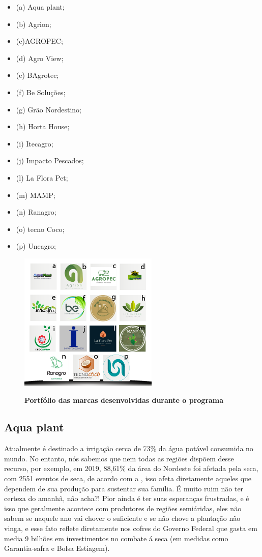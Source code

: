 \begin{multicols}{3}
\centering
    \begin{itemize}
\item {(a) Aqua plant;}
\item {(b) Agrion;}
\item {(c)AGROPEC;}
\item {(d) Agro View;}
\item {(e) BAgrotec;}
\item {(f) Be Soluções;}
\item {(g) Grão Nordestino;}
\item {(h) Horta House;}
\item {(i) Itecagro;}
\item {(j) Impacto Pescados;}
\item {(l) La Flora Pet;}
\item {(m) MAMP;}
\item {(n) Ranagro;}
\item {(o) tecno Coco;}
\item {(p) Uneagro;}
\end{itemize}
\end{multicols}

\begin{figure}[!htb]
\centering
\caption{\textbf{Portfólio das marcas desenvolvidas durante o programa}}
\includegraphics[scale=1.6]{Imagens/portfolio.png}
\label{figura_12}
\end{figure}

\newpage

\subsection{Aqua plant}


Atualmente é destinado a irrigação cerca de 73\% da água potável consumida no mundo.  No entanto, nós sabemos que nem todas as regiões dispõem desse recurso, por exemplo, em 2019, 88,61\% da área do Nordeste foi afetada pela seca, com 2551 eventos de seca, de acordo com a , isso afeta diretamente aqueles que dependem de sua produção para sustentar sua família. É muito ruim não ter certeza do amanhã, não acha?! Pior ainda é ter suas esperanças frustradas, e é isso  que geralmente acontece com produtores de regiões semiáridas, eles não sabem se naquele ano vai chover o suficiente e se não chove a plantação  não vinga, e esse fato reflete diretamente nos cofres do Governo Federal  que gasta em media 9 bilhões em investimentos no combate á seca (em medidas como Garantia-safra e Bolsa Estiagem).

